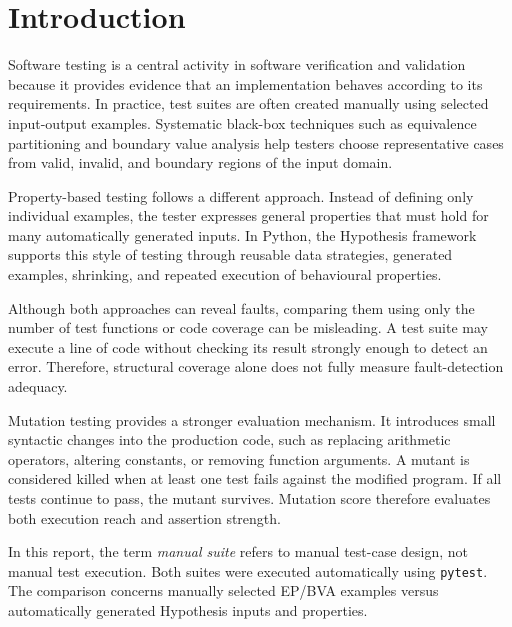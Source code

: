 \documentclass[12pt]{article}
\begin{document}
\newpage

\listoffigures
{}

\newpage


\pagestyle{fancy}

\section{Introduction}

Software testing is a central activity in software verification and
validation because it provides evidence that an implementation behaves
according to its requirements. In practice, test suites are often created
manually using selected input-output examples. Systematic black-box techniques
such as equivalence partitioning and boundary value analysis help testers
choose representative cases from valid, invalid, and boundary regions of the
input domain.

Property-based testing follows a different approach. Instead of defining only
individual examples, the tester expresses general properties that must hold
for many automatically generated inputs. In Python, the Hypothesis framework
supports this style of testing through reusable data strategies, generated
examples, shrinking, and repeated execution of behavioural properties.

Although both approaches can reveal faults, comparing them using only the
number of test functions or code coverage can be misleading. A test suite may
execute a line of code without checking its result strongly enough to detect
an error. Therefore, structural coverage alone does not fully measure
fault-detection adequacy.

Mutation testing provides a stronger evaluation mechanism. It introduces small
syntactic changes into the production code, such as replacing arithmetic
operators, altering constants, or removing function arguments. A mutant is
considered killed when at least one test fails against the modified program.
If all tests continue to pass, the mutant survives. Mutation score therefore
evaluates both execution reach and assertion strength.

In this report, the term \emph{manual suite} refers to manual test-case design,
not manual test execution. Both suites were executed automatically using
\texttt{pytest}. The comparison concerns manually selected EP/BVA examples
versus automatically generated Hypothesis inputs and properties.
\end{document}
